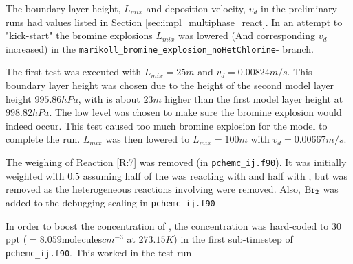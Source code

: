 The boundary layer height, $L_{mix}$ and deposition velocity, $v_d$ in the preliminary runs had values listed in Section \ref{sec:impl_multiphase_react}. In an attempt to "kick-start" the bromine explosions $L_{mix}$ was lowered (And corresponding $v_d$ increased) in the \texttt{marikoll\_bromine\_explosion\_noHetChlorine}- branch. 

\medskip

The first test was executed with $L_{mix} = 25 m$ and $v_d = 0.00824 m/s$. This boundary layer height was chosen due to the height of the second model layer height $995.86 hPa$, with is about $23 m$ higher than the first model layer height at $998.82 hPa$. The low level was chosen to make sure the bromine explosion would indeed occur. This test caused too much bromine explosion for the model to complete the run. $L_{mix}$ was then lowered to $L_{mix} = 100 m$ with $v_d = 0.00667 m/s$. 




The weighing of Reaction \ref{R:7} was removed (in \texttt{pchemc\_ij.f90}). It was initially weighted with $0.5$ assuming half of the  was reacting with  and half with , but was removed as the heterogeneous reactions involving  were removed. Also, $\mathrm{Br_2}$ was added to the debugging-scaling in \texttt{pchemc\_ij.f90}


In order to boost the concentration of , the concentration was hard-coded to 30 ppt ($= 8.059 \text{molecules}cm^{-3}$ at $273.15 K$) in the first sub-timestep of \texttt{pchemc\_ij.f90}. This worked in the test-run



